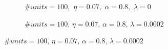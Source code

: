 \documentclass[11pt]{article}
\begin{document}
\begin{figure}[H]
\begin{subfigure}[b]{0.45\textwidth}
     \end{subfigure}
        \vspace{-0.16cm}
    \begin{subfigure}[b]{0.45\textwidth}
        \centering
         \caption{$\# units = 100,\,\, \eta = 0.07,\,\, \alpha = 0.8,\,\, \lambda = 0$}
         \label{fig:over_1}
    \end{subfigure}
    \hfill
    \begin{subfigure}[b]{0.45\textwidth}
        \centering
         \caption{$\# units = 100,\, \eta = 0.07,\, \alpha = 0.8,\, \lambda = 0.0002$}
         \label{fig:reg_1}
     \end{subfigure}

\end{figure}
\end{document}
